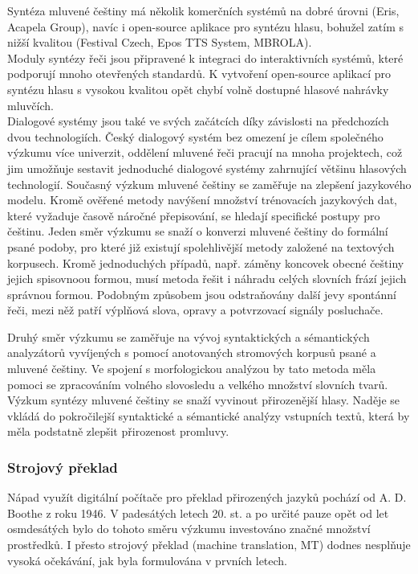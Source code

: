 \documentclass[]{../../metanetpaper}
\begin{document}
\begin{multicols}{2}
Syntéza mluvené češtiny má několik komerčních systémů na dobré úrovni (Eris\cite{Note11}, Acapela Group\cite{Note14}), navíc i open-source aplikace pro syntézu hlasu, bohužel zatím s nižší kvalitou (Festival Czech\cite{Note15}, Epos TTS System\cite{Note16}, MBROLA\cite{Note17}).\\
Moduly syntézy řeči jsou připravené k integraci do interaktivních systémů, které podporují mnoho otevřených standardů. K vytvoření open-source aplikací pro syntézu hlasu s vysokou kvalitou opět chybí volně dostupné hlasové nahrávky mluvčích.\\
Dialogové systémy jsou také ve svých začátcích díky závislosti na předchozích dvou technologiích. Český dialogový systém bez omezení je cílem společného výzkumu více univerzit, oddělení mluvené řeči pracují na mnoha projektech, což jim umožňuje sestavit jednoduché dialogové systémy zahrnující většinu hlasových technologií. Současný výzkum mluvené češtiny se zaměřuje na zlepšení jazykového modelu.  Kromě ověřené metody navýšení množství trénovacích jazykových dat, které vyžaduje časově náročné přepisování, se hledají specifické postupy pro češtinu. Jeden směr výzkumu se snaží o konverzi mluvené češtiny do formální psané podoby, pro které již existují spolehlivější metody založené na textových korpusech. Kromě jednoduchých případů, např. záměny koncovek obecné češtiny jejich spisovnoou formou, musí metoda řešit i náhradu celých slovních frází jejich správnou formou. Podobným způsobem jsou odstraňovány další jevy spontánní řeči, mezi něž patří výplňová slova, opravy a potvrzovací signály posluchače.

Druhý směr výzkumu se zaměřuje na vývoj syntaktických a sémantických analyzátorů vyvíjených s pomocí anotovaných stromových korpusů psané a mluvené češtiny.  Ve spojení s morfologickou analýzou by tato metoda měla pomoci se zpracováním volného slovosledu a velkého množství slovních tvarů.\\
Výzkum syntézy mluvené češtiny se snaží vyvinout přirozenější hlasy. Naděje se vkládá do pokročilejší syntaktické a sémantické analýzy vstupních textů, která by měla podstatně zlepšit přirozenost promluvy.

\subsubsection{Strojový překlad}

Nápad využít digitální počítače pro překlad přirozených jazyků pochází od A. D. Boothe z roku 1946. V padesátých letech 20. st. a po určité pauze opět od let osmdesátých bylo do tohoto směru výzkumu investováno značné množství prostředků. I přesto strojový překlad (machine translation, MT) dodnes nesplňuje vysoká očekávání, jak byla formulována v prvních letech.


\end{multicols}
\end{document}
